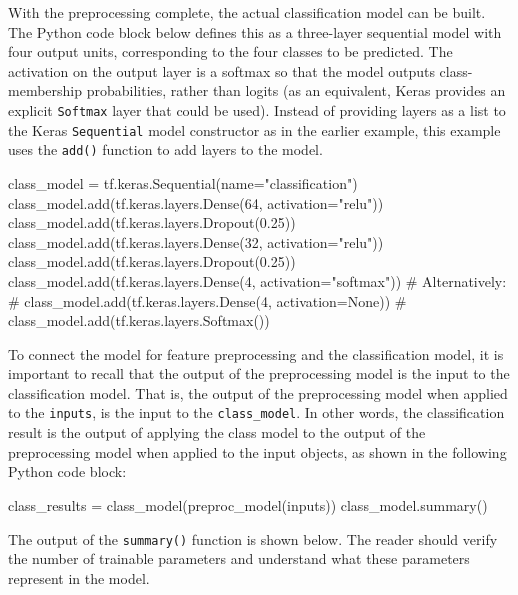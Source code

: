 With the preprocessing complete, the actual classification model can be built. The Python code block below defines this as a three-layer sequential model with four output units, corresponding to the four classes to be predicted. The activation on the output layer is a softmax so that the model outputs class-membership probabilities, rather than logits (as an equivalent, Keras provides an explicit \texttt{Softmax} layer that could be used). Instead of providing layers as a list to the Keras \texttt{Sequential} model constructor as in the earlier example, this example uses the \texttt{add()} function to add layers to the model.

\begin{samepage}
\begin{pythoncode}
class_model = tf.keras.Sequential(name="classification")
class_model.add(tf.keras.layers.Dense(64, activation="relu"))
class_model.add(tf.keras.layers.Dropout(0.25))
class_model.add(tf.keras.layers.Dense(32, activation="relu"))
class_model.add(tf.keras.layers.Dropout(0.25))
class_model.add(tf.keras.layers.Dense(4, activation="softmax"))
# Alternatively:
# class_model.add(tf.keras.layers.Dense(4, activation=None))
# class_model.add(tf.keras.layers.Softmax())
\end{pythoncode}
\end{samepage}

To connect the model for feature preprocessing and the classification model, it is important to recall that the output of the preprocessing model is the input to the classification model. That is, the output of the preprocessing model when applied to the \texttt{inputs}, is the input to the \texttt{class\_model}. In other words, the classification result is the output of applying the class model to the output of the preprocessing model when applied to the input objects, as shown in the following Python code block:

\begin{samepage}
\begin{pythoncode}
class_results = class_model(preproc_model(inputs))
class_model.summary()
\end{pythoncode}
\end{samepage}

The output of the \texttt{summary()} function is shown below. The reader should verify the number of trainable parameters and understand what these parameters represent in the model.

